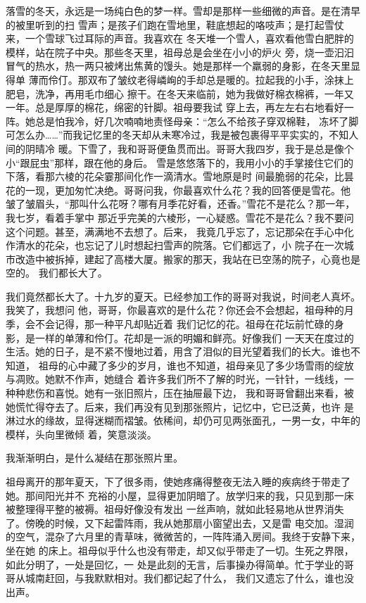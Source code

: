 		落雪的冬天，永远是一场纯白色的梦一样。雪却是那样一些细微的声音。是在清早的被里听到的扫
	雪声；是孩子们跑在雪地里，鞋底想起的咯吱声；是打起雪仗来，一个雪球飞过耳际的声音。我喜欢在
	冬天堆一个雪人，喜欢看他雪白肥胖的模样，站在院子中央。那些冬天里，祖母总是会坐在小小的炉火
	旁，烧一壶汩汩冒气的热水，热一两只被烤出焦黄的馒头。她是那样一个羸弱的身影，在冬天里显得单
	薄而伶仃。那双布了皱纹老得嶙峋的手却总是暖的。拉起我的小手，涂抹上肥皂，洗净，再用毛巾细心
	擦干。在冬天来临前，她为我做好棉衣棉裤，一年又一年。总是厚厚的棉花，绵密的针脚。祖母要我试
	穿上去，再左左右右地看好一阵。她总是怕我冷，好几次喃喃地责怪母亲：“怎么不给孩子穿双棉鞋，
	冻坏了脚可怎么办……”而我记忆里的冬天却从未寒冷过，我是被包裹得平平实实的，不知人间的阴晴冷
	暖。下雪了，我和哥哥便鱼贯而出。哥哥大我四岁，我于是总是像个小“跟屁虫”那样，跟在他的身后。
	雪是悠悠落下的，我用小小的手掌接住它们的下落，看那六棱的花朵霎那间化作一滴清水。雪地原是时
	间最脆弱的花朵，比昙花的一现，更加匆忙决绝。哥哥问我，你最喜欢什么花？我的回答便是雪花。他
	皱了皱眉头，“那叫什么花呀？哪有月季花好看，还香。”雪花不是花么？那一年，我七岁，看着手掌中
	那近乎完美的六棱形，一心疑惑。雪花不是花么？我不要问这个问题。甚至，满满地不去想了。后来，
	我竟几乎忘了，忘记那朵在手心中化作清水的花朵，也忘记了儿时想起扫雪声的院落。它们都远了，小
	院子在一次城市改造中被拆掉，建起了高楼大厦。搬家的那天，我站在已空荡的院子，心竟也是空的。
	我们都长大了。

		我们竟然都长大了。十九岁的夏天。已经参加工作的哥哥对我说，时间老人真坏。我笑了，我想问
	他，哥哥，你最喜欢的是什么花？你还会不会想起，祖母种的月季，会不会记得，那一种平凡却贴近着
	我们记忆的花。祖母在花坛前忙碌的身影，是一样的单薄和伶仃。花却是一派的明媚和鲜亮。好像我们
	一天天在度过的生活。她的日子，是不紧不慢地过着，用含了泪似的目光望着我们的长大。谁也不知道，
	祖母的心中藏了多少的岁月，谁也不知道，祖母亲见了多少场雪雨的绽放与凋败。她默不作声，她缝合
	着许多我们所不了解的时光，一针针，一线线，一种种悲伤和喜悦。她有一张旧照片，压在抽屉最下边，
	我和哥哥曾翻出来看，被她慌忙得夺去了。后来，我们再没有见到那张照片，记忆中，它已泛黄，也许
	是淋过水的缘故，显得迷糊而褶皱。依稀间，却仍可见两张面孔，一男一女，中年的模样，头向里微倾
	着，笑意淡淡。

		我渐渐明白，是什么凝结在那张照片里。

		祖母离开的那年夏天，下了很多雨，使她疼痛得整夜无法入睡的疾病终于带走了她。那间阳光并不
	充裕的小屋，显得更加阴暗了。放学归来的我，只见到那一床被整理得平整的被褥。祖母好像没有发出
	一丝声响，就如此轻易地从世界消失了。傍晚的时候，又下起雷阵雨，我从她那扇小窗望出去，又是雷
	电交加。湿润的空气，混杂了六月里的青草味，微微苦的，一阵阵涌入房间。我终于安静下来，坐在她
	的床上。祖母似乎什么也没有带走，却又似乎带走了一切。生死之界限，如此分明了，一处是回忆，一
	处是此刻的无言，后事操办得简单。忙于学业的哥哥从城南赶回，与我默默相对。我们都记起了什么，
	我们又遗忘了什么，谁也没出声。


